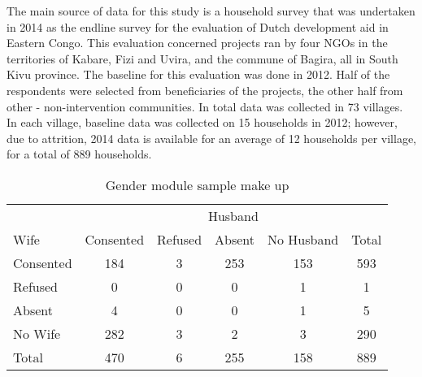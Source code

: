 \documentclass[10pt,a4paper]{scrartcl} %
\newcommand{\tableloc}{C:/Users/Koen/Dropbox/PhD/Papers/CongoGBV/Tables}
\begin{document}
\newcommand{\summstat}[2]{\csvreader[filter strcmp={\var}{#1}]{\tableloc/balance.csv}{var=\var,#2=\stat}{\stat}}
The main source of data for this study is a household survey that was undertaken in 2014 as the endline survey for the evaluation of Dutch development aid in Eastern Congo. This evaluation concerned projects ran by four NGOs in the territories of Kabare, Fizi and Uvira, and the commune of Bagira, all in South Kivu province. The baseline for this evaluation was done in 2012. Half of the respondents were selected from beneficiaries of the projects, the other half from other - non-intervention communities. In total data was collected in 73 villages. In each village, baseline data was collected on 15 households in 2012; however, due to attrition, 2014 data is available for an average of 12 households per village, for a total of 889 households. 

\begin{table}[htb]
	\centering
	\caption{Gender module sample make up}
	\label{tab:bargsample}
	\begin{tabular}{l c c c c c}
		\toprule
		& \multicolumn{5}{c}{Husband} \\
Wife&Consented&Refused&Absent&No Husband&Total \\
\hline
Consented&184&3&253&153&593 \\
Refused&0&0&0&1&1 \\
Absent&4&0&0&1&5 \\
No Wife&282&3&2&3&290 \\
Total&470&6&255&158&889 \\
\bottomrule
	\end{tabular}
\end{table}
\end{document}
